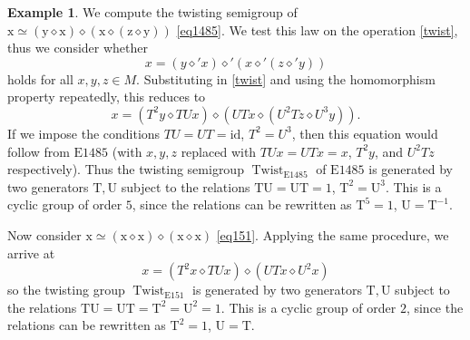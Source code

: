 \documentclass[12pt]{amsart}
\theoremstyle{definition}
\newtheorem{example}[theorem]{Example}
\newcommand{\x}{\mathrm{x}}
\newcommand{\y}{\mathrm{y}}
\newcommand{\z}{\mathrm{z}}
\newcommand{\op}{\diamond}
\newcommand{\formaleq}{\simeq}
\newcommand{\Eq}[1]{\mathrm{E}#1}
\begin{document}
\begin{example}  We compute the twisting semigroup of $\x \formaleq (\y \op \x) \op (\x \op (\z \op \y))$ \eqref{eq1485}.  We test this law on the operation \eqref{twist}, thus we consider whether
$$x = (y \op' x) \op' (x \op' (z \op' y))$$
holds for all $x,y,z \in M$.  Substituting in \eqref{twist} and using the homomorphism property repeatedly, this reduces to
$$x = (T^2y \op TUx) \op (UTx \op (U^2T z \op U^3y)).$$
If we impose the conditions $TU=UT=\mathrm{id}$, $T^2 = U^3$, then this equation would follow from $\Eq{1485}$ (with $x,y,z$ replaced with $TUx=UTx=x$, $T^2 y$, and $U^2 Tz$ respectively).  Thus the twisting semigroup $\operatorname{Twist}_{\Eq{1485}}$ of $\Eq{1485}$ is generated by two generators $\mathrm{T}, \mathrm{U}$ subject to the relations $\mathrm{T} \mathrm{U}=\mathrm{U} \mathrm{T} = 1$, $\mathrm{T}^2 = \mathrm{U}^3$.  This is a cyclic group of order $5$, since the relations can be rewritten as $\mathrm{T}^5 = 1$, $\mathrm{U} = \mathrm{T}^{-1}$.

Now consider $\x \formaleq (\x \op \x) \op (\x \op \x)$ \eqref{eq151}.  Applying the same procedure, we arrive at
$$x = (T^2 x \op TUx) \op (UT x \op U^2 x)$$
so the twisting group $\operatorname{Twist}_{\Eq{151}}$ is generated by two generators $\mathrm{T}, \mathrm{U}$ subject to the relations $\mathrm{T} \mathrm{U}=\mathrm{U} \mathrm{T} = \mathrm{T}^2 = \mathrm{U}^2 = 1$.  This is a cyclic group of order $2$, since the relations can be rewritten as $\mathrm{T}^2 = 1$, $\mathrm{U} = \mathrm{T}$.
\end{example}
\end{document}
